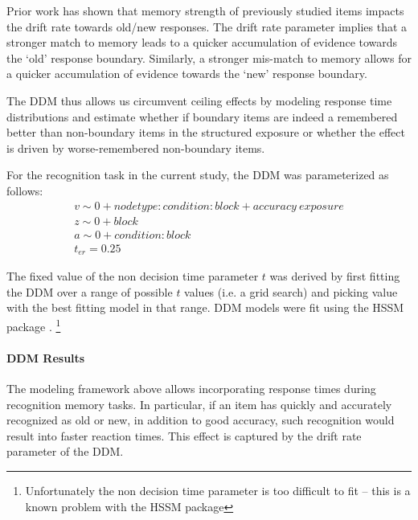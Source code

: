 Prior work has shown that memory strength of previously studied items impacts the drift rate towards old/new responses. The drift rate parameter implies that a stronger match to memory leads to a quicker accumulation of evidence towards the `old' response boundary. Similarly, a stronger mis-match to memory allows for a quicker accumulation of evidence towards the `new' response boundary\cite{ratcliff2004diffusion,ratcliff2022discriminating}. 

The DDM thus allows us circumvent ceiling effects by modeling response time distributions and estimate whether if boundary items are indeed a remembered better than non-boundary items in the structured exposure or whether the effect is driven by worse-remembered non-boundary items. 

For the recognition task in the current study, the DDM was parameterized as follows: 
\begin{equation}
    \begin{aligned}
        v \sim 0 + node type:condition:block + accuracy\ exposure \\
        z \sim 0 + block \\
        a \sim 0 + condition:block \\
        t_{er} = 0.25
    \end{aligned}
\end{equation}

The fixed value of the non decision time parameter $t$ was derived by first fitting the DDM over a range of possible $t$ values (i.e. a grid search) and picking value with the best fitting model in that range. DDM models were fit using the HSSM package \cite{fengler2022beyond}. \footnote{Unfortunately the non decision time parameter is too difficult to fit -- this is a known problem with the HSSM package} 

\paragraph*{DDM Results}
The modeling framework above allows incorporating response times during recognition memory tasks. In particular, if an item has quickly and accurately recognized as old or new, in addition to good accuracy, such recognition would result into faster reaction times. This effect is captured by the drift rate parameter of the DDM. 

